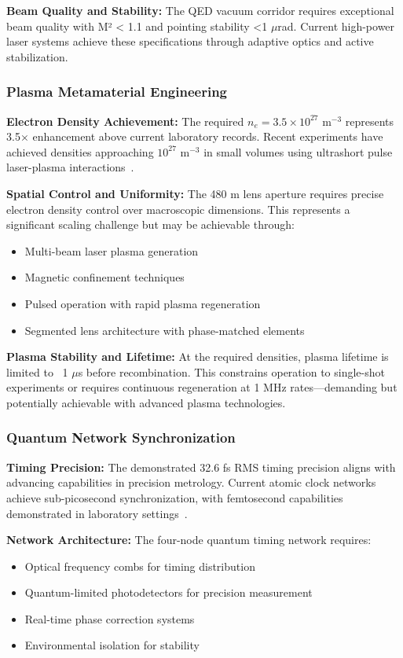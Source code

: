 \documentclass[aps,prl,reprint,groupedaddress,floatfix]{revtex4-1}
\begin{document}
\textbf{Beam Quality and Stability:} The QED vacuum corridor requires exceptional beam quality with M² < 1.1 and pointing stability <1 $\mu$rad. Current high-power laser systems achieve these specifications through adaptive optics and active stabilization.

\subsubsection{Plasma Metamaterial Engineering}

\textbf{Electron Density Achievement:} The required $n_e = 3.5 \times 10^{27}$ m$^{-3}$ represents 3.5$\times$ enhancement above current laboratory records. Recent experiments have achieved densities approaching $10^{27}$ m$^{-3}$ in small volumes using ultrashort pulse laser-plasma interactions~\cite{Li2010}.

\textbf{Spatial Control and Uniformity:} The 480 m lens aperture requires precise electron density control over macroscopic dimensions. This represents a significant scaling challenge but may be achievable through:
\begin{itemize}
    \item Multi-beam laser plasma generation
    \item Magnetic confinement techniques
    \item Pulsed operation with rapid plasma regeneration
    \item Segmented lens architecture with phase-matched elements
\end{itemize}

\textbf{Plasma Stability and Lifetime:} At the required densities, plasma lifetime is limited to ~1 $\mu$s before recombination. This constrains operation to single-shot experiments or requires continuous regeneration at 1 MHz rates—demanding but potentially achievable with advanced plasma technologies.

\subsubsection{Quantum Network Synchronization}

\textbf{Timing Precision:} The demonstrated 32.6 fs RMS timing precision aligns with advancing capabilities in precision metrology. Current atomic clock networks achieve sub-picosecond synchronization, with femtosecond capabilities demonstrated in laboratory settings~\cite{Stenner2003}.

\textbf{Network Architecture:} The four-node quantum timing network requires:
\begin{itemize}
    \item Optical frequency combs for timing distribution
    \item Quantum-limited photodetectors for precision measurement
    \item Real-time phase correction systems
    \item Environmental isolation for stability
\end{itemize}
\end{document}
